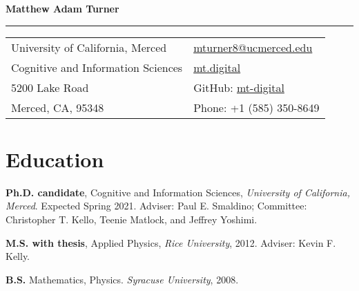 \documentclass[letterpaper,11pt,oneside]{article}
\begin{document}

\noindent  \textcolor{gunmetal}{\LARGE{\textbf{Matthew Adam Turner}}} \\
\vspace{-2ex}
\hrule 
\normalsize


\begin{center}
\begin{tabular}{l l}
 University of California, Merced & \hspace{1in} \href{mailto:mturner8@ucmerced.edu}{mturner8@ucmerced.edu} \\
 Cognitive and Information Sciences    & \hspace{1in}  \href{http://mt.digital}{mt.digital}   \\
  5200 Lake Road             & \hspace{1in} GitHub: \href{https://github.com/mt-digital}{mt-digital}  \\
 Merced, CA, 95348 & \hspace{1in} Phone: +1 (585) 350-8649 \\
\end{tabular}
\end{center}


\section*{\textcolor{gunmetal}{Education}}

  \begin{hangparas}{0.25in}{1}

    \textbf{Ph.D. candidate}, Cognitive and Information 
      Sciences, \emph{University of California, Merced}. Expected Spring 2021. Adviser: Paul E. Smaldino; Committee:
    Christopher T. Kello, Teenie Matlock, and Jeffrey Yoshimi.

    \textbf{M.S. with thesis}, Applied Physics, \emph{Rice University}, 2012. Adviser: 
      Kevin F. Kelly.

    \textbf{B.S.} Mathematics, Physics. \emph{Syracuse University}, 2008.
  \end{hangparas}
\end{document}
